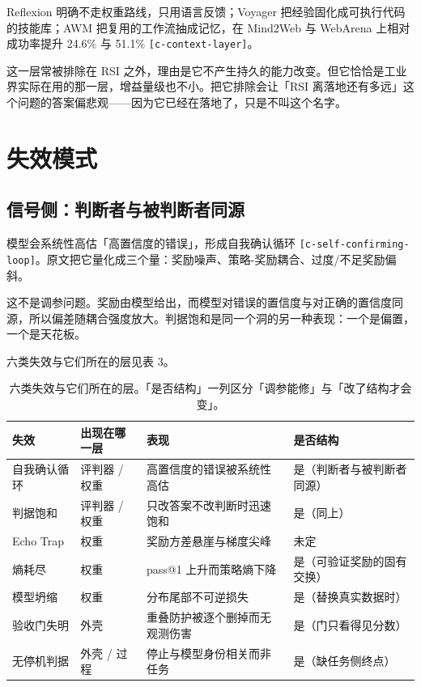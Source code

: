 Reflexion 明确不走权重路线，只用语言反馈；Voyager 把经验固化成可执行代码的技能库；AWM 把复用的工作流抽成记忆，在 Mind2Web 与 WebArena 上相对成功率提升 24.6\% 与 51.1\% {\scriptsize\texttt{[c-\hspace{0pt}context-\hspace{0pt}layer]}}。


这一层常被排除在 RSI 之外，理由是它不产生持久的能力改变。但它恰恰是工业界实际在用的那一层，增益量级也不小。把它排除会让「RSI 离落地还有多远」这个问题的答案偏悲观——因为它已经在落地了，只是不叫这个名字。


\section{失效模式}

\subsection{信号侧：判断者与被判断者同源}

模型会系统性高估「高置信度的错误」，形成自我确认循环 {\scriptsize\texttt{[c-\hspace{0pt}self-\hspace{0pt}confirming-\hspace{0pt}loop]}}。原文把它量化成三个量：奖励噪声、策略-奖励耦合、过度/不足奖励偏斜。


这不是调参问题。奖励由模型给出，而模型对错误的置信度与对正确的置信度同源，所以偏差随耦合强度放大。判据饱和是同一个洞的另一种表现：一个是偏置，一个是天花板。


六类失效与它们所在的层见表 3。


\begin{table}[t]
\centering
\footnotesize
\setlength{\tabcolsep}{4pt}
\caption{六类失效与它们所在的层。「是否结构」一列区分「调参能修」与「改了结构才会变」。}
\label{tab:3}
\begin{tabular}{llll}
\toprule
失效 & 出现在哪一层 & 表现 & 是否结构 \\
\midrule
自我确认循环 & 评判器 / 权重 & 高置信度的错误被系统性高估 & 是（判断者与被判断者同源） \\
判据饱和 & 评判器 / 权重 & 只改答案不改判断时迅速饱和 & 是（同上） \\
Echo Trap & 权重 & 奖励方差悬崖与梯度尖峰 & 未定 \\
熵耗尽 & 权重 & pass@1 上升而策略熵下降 & 是（可验证奖励的固有交换） \\
模型坍缩 & 权重 & 分布尾部不可逆损失 & 是（替换真实数据时） \\
验收门失明 & 外壳 & 重叠防护被逐个删掉而无观测伤害 & 是（门只看得见分数） \\
无停机判据 & 外壳 / 过程 & 停止与模型身份相关而非任务 & 是（缺任务侧终点） \\
\bottomrule
\end{tabular}
\end{table}

